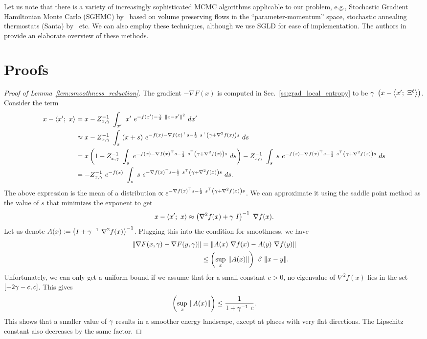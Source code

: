 \documentclass[10pt]{article}
\newcommand{\minibatch}[1]{\Xi^{#1}}
\begin{document}
\begin{appendices}
Let us note that there is a variety of increasingly sophisticated MCMC algorithms applicable to our problem, e.g., Stochastic Gradient Hamiltonian Monte Carlo (SGHMC) by~\citet{chen2014stochastic} based on volume preserving flows in the ``parameter-momentum'' space, stochastic annealing thermostats (Santa) by~\citet{chen2015bridging} etc. We can also employ these techniques, although we use SGLD for ease of implementation. The authors in~\citet{ma2015complete} provide an elaborate overview of these methods.

\section{Proofs}
\label{s:app:proofs}

\begin{proof}[Proof of Lemma~\ref{lem:smoothness_reduction}]
The gradient $-\nabla F(x)$ is computed in Sec.~\ref{ss:grad_local_entropy} to be $\g\ \rbrac{x - \ag{x';\ \minibatch{\ell}}}$. Consider the term
\begin{align*}
    x - \ag{x';\ x}
    &= x - Z_{x,\g}^{-1}\ \int_{x'}\ x'\ e^{-f(x') - \f{\g}{2}\ \norm{x-x'}^2}\ dx'\\
    &\approx x - Z_{x,\g}^{-1}\ \int_{s}\ (x + s)\ e^{-f(x) - \nabla f(x)^\top s - \f{1}{2}\ s^\top \rbrac{\g + \nabla^2 f(x)} s}\ ds\\
    &= x\rbrac{1 -  Z_{x,\g}^{-1}\ \int_{s}\ e^{-f(x) - \nabla f(x)^\top s - \f{1}{2}\ s^\top \rbrac{\g + \nabla^2 f(x)} s}\ ds} - Z_{x,\g}^{-1}\ \int_{s}\ s\ e^{-f(x) - \nabla f(x)^\top s - \f{1}{2}\ s^\top \rbrac{\g + \nabla^2 f(x)} s}\ ds\\
    &= -Z_{x,\g}^{-1}\ e^{-f(x)}\ \int_{s}\ s\ e^{-\nabla f(x)^\top s - \f{1}{2}\ s^\top \rbrac{\g + \nabla^2 f(x)} s}\ ds.
\end{align*}
The above expression is the mean of a distribution $\propto e^{-\nabla f(x)^\top s - \frac{1}{2}\ s^\top \left(\gamma + \nabla^2 f(x)\right) s}$. We can approximate it using the saddle point method as the value of $s$ that minimizes the exponent to get
$$
    x - \left\langle x';\ x\right\rangle \approx \left(\nabla^2 f(x) + \gamma\ I\right)^{-1}\ \nabla f(x).
$$
Let us denote $A(x) := \left(I + \gamma^{-1}\ \nabla^2 f(x)\right)^{-1}$. Plugging this into the condition for smoothness, we have
\begin{align*}
    \lVert\nabla F(x, \gamma) - \nabla F(y, \gamma)\rVert
    &= \lVert A(x)\ \nabla f(x) - A(y)\ \nabla f(y)\rVert\\
    &\leq \left(\sup_x\ \lVert A(x)\rVert\right)\ \beta\ \lVert x-y\rVert.
\end{align*}
Unfortunately, we can only get a uniform bound if we assume that for a small constant $c > 0$, no eigenvalue of $\nabla^2 f(x)$ lies in the set $[-2 \gamma -c, c]$. This gives
$$
    \left(\sup_x\ \lVert A(x)\rVert\right) \leq \frac{1}{1+\gamma^{-1}\ c}.
$$
This shows that a smaller value of $\gamma$ results in a smoother energy landscape, except at places with very flat directions. The Lipschitz constant also decreases by the same factor.
\end{proof}


\end{appendices}
\end{document}
